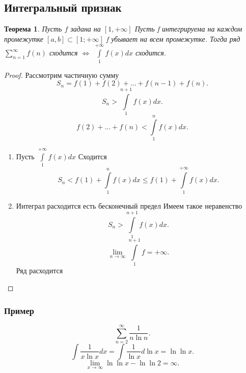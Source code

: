 \documentclass{scrartcl}
\newtheorem{theorem}{Теорема}
\begin{document}
\subsection{Интегральный признак}
\begin{theorem}
    Пусть $f$ задана на  $[1,+\infty]$ Пусть f интегрируема на каждом промежутке $[a,b] \subset [1;+\infty]$ f убывает на всем промежутке. Тогда ряд $\sum_{n=1}^{\infty} f(n)$ сходится $\iff$  $\int\limits_{1}^{+\infty} f(x) dx$   сходится. 
\end{theorem}
\begin{proof}
    Рассмотрим частичную сумму 
    \[
    S_{n} = f(1) + f(2) + \dots + f(n - 1) + f(n)
    .\] 
    \[
    S_{n} > \int\limits_{1}^{n + 1} f(x)  dx
    .\] 
    \[
    f(2) + \dots + f(n) < \int\limits_{1}^{n} f(x)  dx
    .\] 
    \begin{enumerate}
        \item Пусть $\int\limits_{1}^{+\infty} f(x)  dx$ Сходится
            \[
            S_{n} < f(1) + \int\limits_{1}^{n} f(x) dx \le f(1) + \int\limits_{1}^{+\infty} f(x)   dx
            .\] 
        \item Интеграл расходится есть бесконечный предел
            Имеем такое неравенство
            \[
            S_{n} > \int\limits_{1}^{n+ 1} f(x) dx
            .\] 
            \[
            \lim_{n \to \infty} \int\limits_{1}^{n+1} f = +\infty 
            .\] 
            Ряд расходится
    \end{enumerate}
\end{proof}
\subsubsection{Пример}
\[
    \sum_{n=2}^{\infty} \frac{1}{n \ln{n}}
.\] 
\[
    \int \frac{1}{x \ln{x}} dx = \int \frac{1}{\ln{x}} d \ln{x} = \ln{\ln{x}}
.\] 
\[
    \lim_{x \to \infty} \ln{\ln{x}} - \ln{\ln{2}} = \infty
.\] 
\end{document}
